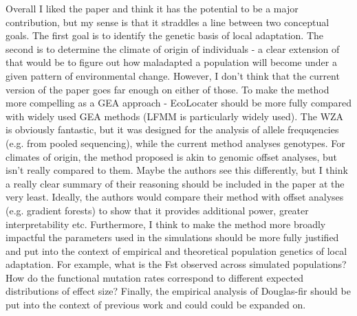 \begin{point}{} %
Overall I liked the paper and think it has the potential to be a major contribution, but my sense is that it straddles a line between two conceptual goals. The first goal is to identify the genetic basis of local adaptation. The second is to determine the climate of origin of individuals - a clear extension of that would be to figure out how maladapted a population will become under a given pattern of environmental change. However, I don't think that the current version of the paper goes far enough on either of those. To make the method more compelling as a GEA approach - EcoLocater should be more fully compared with widely used GEA methods (LFMM is particularly widely used). The WZA is obviously fantastic, but it was designed for the analysis of allele frequqencies (e.g. from pooled sequencing), while the current method analyses genotypes. For climates of origin, the method proposed is akin to genomic offset analyses, but isn't really compared to them. Maybe the authors see this differently, but I think a really clear summary of their reasoning should be included in the paper at the very least. Ideally, the authors would compare their method with offset analyses (e.g. gradient forests) to show that it provides additional power, greater interpretability etc. Furthermore, I think to make the method more broadly impactful the parameters used in the simulations should be more fully justified and put into the context of empirical and theoretical population genetics of local adaptation. For example, what is the Fst observed across simulated populations? How do the functional mutation rates correspond to different expected distributions of effect size? Finally, the empirical analysis of Douglas-fir should be put into the context of previous work and could could be expanded on.
\end{point}


